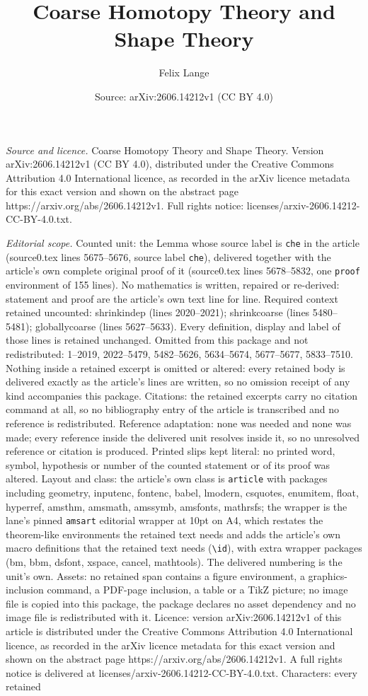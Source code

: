 \documentclass[10pt,a4paper]{amsart}
\title[Coarse Homotopy Theory and Shape Theory]{Coarse Homotopy Theory and Shape Theory}
\author{Felix Lange}
\date{Source: arXiv:2606.14212v1 (CC BY 4.0)}
\begin{document}
\maketitle

\noindent\emph{Source and licence.} Coarse Homotopy Theory and Shape Theory. Version arXiv:2606.14212v1 (CC BY 4.0), distributed under the Creative Commons Attribution 4.0 International licence, as recorded in the arXiv licence metadata for this exact version and shown on the abstract page https://arxiv.org/abs/2606.14212v1. Full rights notice: licenses/arxiv-2606.14212-CC-BY-4.0.txt.\par\smallskip

\noindent\textit{Editorial scope.} Counted unit: the Lemma whose source label is \texttt{che} in the article (source0.tex lines 5675--5676, source label \texttt{che}), delivered together with the article's own complete original proof of it (source0.tex lines 5678--5832, one \texttt{proof} environment of 155 lines). No mathematics is written, repaired or re-derived: statement and proof are the article's own text line for line. Required context retained uncounted: shrinkindep (lines 2020--2021); shrinkcoarse (lines 5480--5481); globallycoarse (lines 5627--5633). Every definition, display and label of those lines is retained unchanged. Omitted from this package and not redistributed: 1--2019, 2022--5479, 5482--5626, 5634--5674, 5677--5677, 5833--7510. Nothing inside a retained excerpt is omitted or altered: every retained body is delivered exactly as the article's lines are written, so no omission receipt of any kind accompanies this package. Citations: the retained excerpts carry no citation command at all, so no bibliography entry of the article is transcribed and no reference is redistributed. Reference adaptation: none was needed and none was made; every reference inside the delivered unit resolves inside it, so no unresolved reference or citation is produced. Printed slips kept literal: no printed word, symbol, hypothesis or number of the counted statement or of its proof was altered. Layout and class: the article's own class is \texttt{article} with packages including geometry, inputenc, fontenc, babel, lmodern, csquotes, enumitem, float, hyperref, amsthm, amsmath, amssymb, amsfonts, mathrsfs; the wrapper is the lane's pinned \texttt{amsart} editorial wrapper at 10pt on A4, which restates the theorem-like environments the retained text needs and adds the article's own macro definitions that the retained text needs (\texttt{\textbackslash id}), with extra wrapper packages (bm, bbm, dsfont, xspace, cancel, mathtools). The delivered numbering is the unit's own. Assets: no retained span contains a figure environment, a graphics-inclusion command, a PDF-page inclusion, a table or a TikZ picture; no image file is copied into this package, the package declares no asset dependency and no image file is redistributed with it. Licence: version arXiv:2606.14212v1 of this article is distributed under the Creative Commons Attribution 4.0 International licence, as recorded in the arXiv licence metadata for this exact version and shown on the abstract page https://arxiv.org/abs/2606.14212v1. A full rights notice is delivered at licenses/arxiv-2606.14212-CC-BY-4.0.txt. Characters: every retained 
\end{document}
